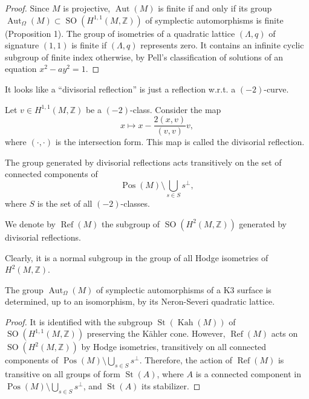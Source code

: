\begin{proof}
Since $M$ is projective, $\operatorname{Aut}(M)$ is
finite if and only if its group $\operatorname{Aut}_{\Omega}(M)\subset
\operatorname{SO}(H^{1,1}(M,\mathbb{Z}))$ of symplectic
automorphisms is finite (Proposition 1). The group
of isometries of a quadratic lattice $(\Lambda,q)$
of signature $(1,1)$ is finite if $(\Lambda,q)$
represents zero. It contains an infinite cyclic
subgroup of finite index otherwise, by Pell's
classification of solutions of an equation
$x^2-ay^2=1$.
\end{proof}

\noindent
It looks like a ``divisorial
reflection'' is just a reflection
w.r.t. a  $(-2)$-curve.

\begin{definition}
Let $v \in H^{1,1}(M,\mathbb{Z})$ be a $(-2)$-class.
Consider the map
\[
x \mapsto x-\frac{2(x,v)}{(v,v)}v,
\]
where $(\cdot,\cdot)$ is the intersection form.
This map is called the divisorial reflection.
\end{definition}

\begin{lemma}
The group generated by divisorial reflections acts
transitively on the set of connected components of
\[
\operatorname{Pos}(M)\setminus \bigcup_{s\in S}s^\perp,
\]
where $S$ is the set of all $(-2)$-classes.
\end{lemma}

\noindent
We denote by $\operatorname{Ref}(M)$ the subgroup
of $\operatorname{SO}(H^2(M,\mathbb{Z}))$
generated by divisorial reflections.

\noindent
Clearly, it is a normal subgroup in the group of
all Hodge isometries of $H^2(M,\mathbb{Z})$.

\begin{lemma}
The group $\operatorname{Aut}_{\Omega}(M)$ of
symplectic automorphisms of a K3 surface is
determined, up to an isomorphism, by its
Neron-Severi quadratic lattice.
\end{lemma}

\begin{proof}
It is identified with the subgroup
$\operatorname{St}(\operatorname{Kah}(M))$ of
$\operatorname{SO}(H^{1,1}(M,\mathbb{Z}))$
preserving the Kähler cone. However,
$\operatorname{Ref}(M)$ acts on
$\operatorname{SO}(H^2(M,\mathbb{Z}))$ by Hodge
isometries, transitively on all connected
components of
$\operatorname{Pos}(M)\setminus
\bigcup_{s\in S}s^\perp$.
Therefore, the action of $\operatorname{Ref}(M)$ is
transitive on all groups of form $\operatorname{St}(A)$,
where $A$ is a connected component in
$\operatorname{Pos}(M)\setminus
\bigcup_{s\in S}s^\perp$, and $\operatorname{St}(A)$
its stabilizer.
\end{proof}

